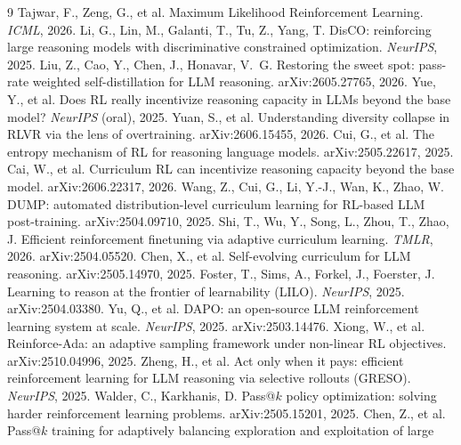 \begin{thebibliography}{9}\small
{} Tajwar, F., Zeng, G., et al.
Maximum Likelihood Reinforcement Learning. \emph{ICML}, 2026.
 Li, G., Lin, M., Galanti, T., Tu,
Z., Yang, T. DisCO: reinforcing large reasoning models with
discriminative constrained optimization. \emph{NeurIPS}, 2025.
 Liu, Z., Cao, Y., Chen, J.,
Honavar, V.~G. Restoring the sweet spot: pass-rate weighted
self-distillation for LLM reasoning. arXiv:2605.27765, 2026.
 Yue, Y., et al. Does RL really
incentivize reasoning capacity in LLMs beyond the base model?
\emph{NeurIPS} (oral), 2025.
 Yuan, S., et al. Understanding
diversity collapse in RLVR via the lens of overtraining.
arXiv:2606.15455, 2026.
 Cui, G., et al. The entropy mechanism of
RL for reasoning language models. arXiv:2505.22617, 2025.
 Cai, W., et al. Curriculum RL can
incentivize reasoning capacity beyond the base model. arXiv:2606.22317,
2026.
 Wang, Z., Cui, G., Li, Y.-J., Wan, K., Zhao, W. DUMP: automated
distribution-level curriculum learning for RL-based LLM post-training.
arXiv:2504.09710, 2025.
 Shi, T., Wu, Y., Song, L., Zhou, T., Zhao, J. Efficient
reinforcement finetuning via adaptive curriculum learning.
\emph{TMLR}, 2026. arXiv:2504.05520.
 Chen, X., et al. Self-evolving
curriculum for LLM reasoning. arXiv:2505.14970, 2025.
 Foster, T., Sims, A., Forkel,
J., Foerster, J. Learning to reason at the frontier of learnability
(LILO). \emph{NeurIPS}, 2025. arXiv:2504.03380.
 Yu, Q., et al. DAPO: an open-source LLM
reinforcement learning system at scale. \emph{NeurIPS}, 2025.
arXiv:2503.14476.
 Xiong, W., et al.
Reinforce-Ada: an adaptive sampling framework under non-linear RL
objectives. arXiv:2510.04996, 2025.
 Zheng, H., et al. Act only
when it pays: efficient reinforcement learning for LLM reasoning via
selective rollouts (GRESO). \emph{NeurIPS}, 2025.
 Walder, C., Karkhanis, D.
Pass@$k$ policy optimization: solving harder reinforcement learning
problems. arXiv:2505.15201, 2025.
 Chen, Z., et al. Pass@$k$ training
for adaptively balancing exploration and exploitation of large

\end{thebibliography}
